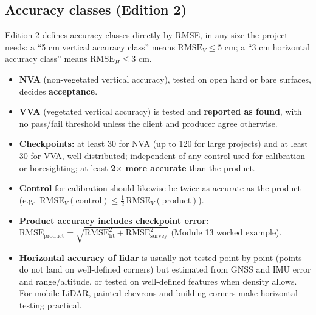 \subsection{Accuracy classes (Edition 2)}
\begin{eng}
Edition 2 defines accuracy classes directly by RMSE, in any size the project needs: a ``5 cm vertical accuracy class'' means $\text{RMSE}_V\le5$ cm; a ``3 cm horizontal accuracy class'' means $\text{RMSE}_H\le3$ cm.
\begin{itemize}
\item \textbf{NVA} (non-vegetated vertical accuracy), tested on open hard or bare surfaces, decides \textbf{acceptance}.
\item \textbf{VVA} (vegetated vertical accuracy) is tested and \textbf{reported as found}, with no pass/fail threshold unless the client and producer agree otherwise.
\item \textbf{Checkpoints:} at least 30 for NVA (up to 120 for large projects) and at least 30 for VVA, well distributed; independent of any control used for calibration or boresighting; at least \textbf{2$\times$ more accurate} than the product.
\item \textbf{Control} for calibration should likewise be twice as accurate as the product (e.g.\ $\text{RMSE}_V(\text{control})\le\tfrac12\,\text{RMSE}_V(\text{product})$).
\item \textbf{Product accuracy includes checkpoint error:} $\text{RMSE}_{\text{product}}=\sqrt{\text{RMSE}_{\text{fit}}^2+\text{RMSE}_{\text{survey}}^2}$ (Module 13 worked example).
\item \textbf{Horizontal accuracy of lidar} is usually not tested point by point (points do not land on well-defined corners) but estimated from GNSS and IMU error and range/altitude, or tested on well-defined features when density allows. For mobile LiDAR, painted chevrons and building corners make horizontal testing practical.
\end{itemize}
\end{eng}

